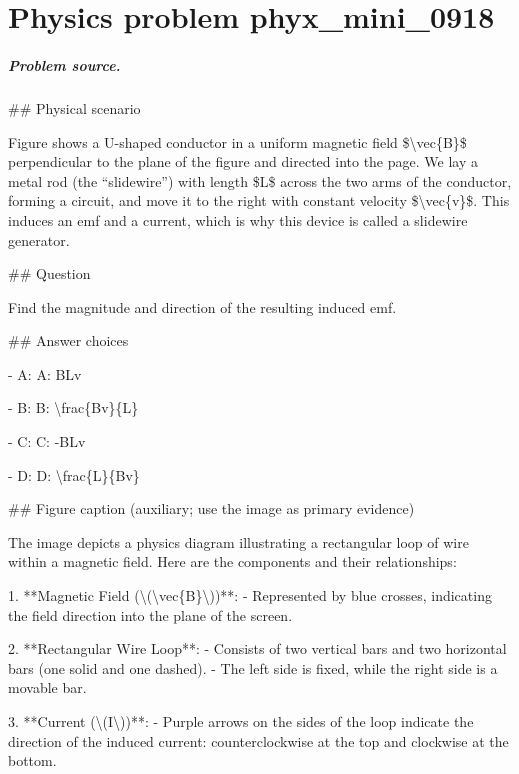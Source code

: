 
\chapter{Physics problem phyx\_mini\_0918}
\label{ch:PhyXMiniProblems_problem_phyx_mini_0918}

\paragraph{Problem source.}
\#\# Physical scenario

Figure shows a U-shaped conductor in a uniform magnetic field \$\textbackslash{}vec\{B\}\$ perpendicular to the plane of the figure and directed into the page. We lay a metal rod (the “slidewire”) with length \$L\$ across the two arms of the conductor, forming a circuit, and move it to the right with constant velocity \$\textbackslash{}vec\{v\}\$. This induces an emf and a current, which is why this device is called a slidewire generator.

\#\# Question

Find the magnitude and direction of the resulting induced emf.

\#\# Answer choices

- A: A: BLv

- B: B: \textbackslash{}frac\{Bv\}\{L\}

- C: C: -BLv

- D: D: \textbackslash{}frac\{L\}\{Bv\}

\#\# Figure caption (auxiliary; use the image as primary evidence)

The image depicts a physics diagram illustrating a rectangular loop of wire within a magnetic field. Here are the components and their relationships:

1. **Magnetic Field (\textbackslash{}(\textbackslash{}vec\{B\}\textbackslash{}))**: 
   - Represented by blue crosses, indicating the field direction into the plane of the screen.

2. **Rectangular Wire Loop**:
   - Consists of two vertical bars and two horizontal bars (one solid and one dashed).
   - The left side is fixed, while the right side is a movable bar.

3. **Current (\textbackslash{}(I\textbackslash{}))**:
   - Purple arrows on the sides of the loop indicate the direction of the induced current: counterclockwise at the top and clockwise at the bottom.

